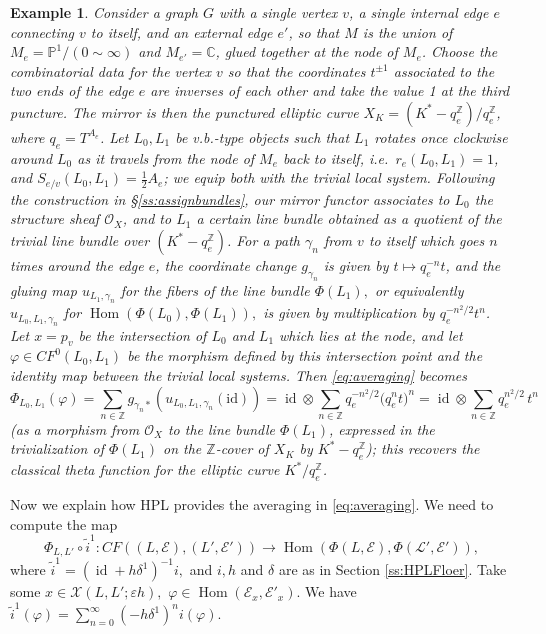 \documentclass[11pt,leqno]{amsart}
\newtheorem{example}[theo]{Example}
\numberwithin{equation}{section}
\def\C{\mathbb{C}}
\def\Z{\mathbb{Z}}
\def\O{{\mathcal O}}
\def\PP{{\mathbb P}}
\def\Hom{\operatorname{Hom}}
\newcommand{\cL}{{\mathcal L}}
\newcommand{\cE}{{\mathcal E}}
\newcommand{\cX}{{\mathcal X}}
\newcommand{\id}{\operatorname{id}}
\begin{document}
\begin{example} Consider a graph $G$ with a single vertex
$v$, a single internal edge $e$ connecting $v$ to itself, and an external
edge $e'$, so that $M$ is the union of $M_e = \PP^1 / (0\sim
\infty)$ and $M_{e'}=\C$, glued together at the node of $M_e$.
Choose the combinatorial data for the vertex $v$ so that the coordinates
$t^{\pm 1}$  associated to the two ends of the edge $e$ are inverses of each other
and take the value 1 at the third puncture.
The mirror is then the punctured elliptic curve $X_K=(K^*-q_e^\Z)/q_e^\Z$, where
$q_e=T^{A_e}$. Let $L_0,L_1$ be v.b.-type objects such that $L_1$ rotates
once clockwise around $L_0$ as it travels from the node of $M_e$ back
to itself, i.e.\ $r_e(L_0,L_1)=1$, and $S_{e/v}(L_0,L_1)=\frac12 A_e$; we
equip both with the trivial local system. Following the construction in
\S \ref{ss:assignbundles}, our mirror functor associates to
$L_0$ the structure sheaf $\O_X$, and to $L_1$ a certain line bundle
obtained as a quotient of the trivial line bundle over $(K^*-q_e^\Z)$. 
For a path $\gamma_n$ from $v$ to itself which goes $n$ times around the edge $e$, the
coordinate change $g_{\gamma_n}$ is given by $t\mapsto q_e^{-n} t$, and the gluing
map $u_{L_1,\gamma_n}$ for the fibers of the line bundle $\Phi(L_1),$ or
equivalently $u_{L_0,L_1,\gamma_n}$ for $\Hom(\Phi(L_0),\Phi(L_1)),$ is given by 
multiplication by $q_e^{-n^2/2} t^{n}$. 
Let $x=p_v$ be the intersection of $L_0$ and $L_1$ which lies at the node, and
let $\varphi\in CF^0(L_0,L_1)$ be the morphism defined by this intersection
point and the identity map between the trivial local systems. Then
\eqref{eq:averaging} becomes
$$\Phi_{L_0,L_1}(\varphi)=\sum_{n\in\Z} g_{\gamma_n *}(u_{L_0,L_1,\gamma_n}(\mathrm{id}))=
\id\otimes \sum_{n\in\Z} 
q_e^{-n^2/2} \bigl(q_e^{n}t\bigr)^{n}=\id\otimes \sum_{n\in\Z} q_e^{n^2/2}\, t^n$$
(as a morphism from $\O_X$ to the line bundle $\Phi(L_1)$, expressed in the trivialization of 
$\Phi(L_1)$ on the $\Z$-cover of $X_K$ by $K^*-q_e^\Z$); 
this recovers the classical theta function for the elliptic curve $K^*/q_e^\Z$.
\end{example}

Now we explain how HPL provides the averaging in \eqref{eq:averaging}. We need to compute the map $$\Phi_{L,L'}\circ\tilde{i}^1:CF((L,\cE),(L',\cE'))\to \Hom(\Phi(L,\cE),\Phi(\cL',\cE')),$$ where $\tilde{i}^1=(\id+h\delta^1)^{-1}i,$ and $i, h$ and $\delta$ are as in Section \ref{ss:HPLFloer}. 
Take some $x\in \cX(L,L';\varepsilon h),$ $\varphi\in\Hom(\cE_x,\cE'_x).$ We have $\tilde{i}^1(\varphi)=\sum\limits_{n=0}^{\infty}(-h\delta^1)^n i(\varphi).$  
\end{document}
